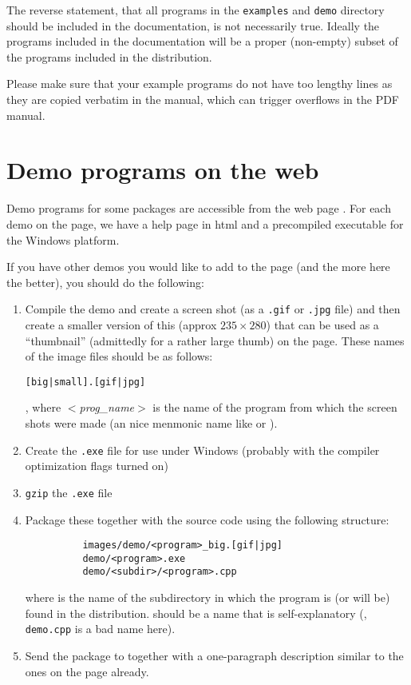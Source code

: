 The reverse statement, that all programs in the \texttt{examples}
and \texttt{demo} directory should be included in the documentation,
is not necessarily true.  Ideally the programs included in the documentation
will be a proper (non-empty) subset of the programs included in the 
distribution.

Please make sure that your example programs do not have too lengthy lines
as they are copied verbatim in the manual, which can trigger overflows
in the PDF manual.

\section{Demo programs on the web\label{sec:demos_web_page}}

Demo programs for some packages are accessible from the 
web page .
For each demo on the page, we have a help page in html and a
precompiled executable for the Windows platform. 

If you have other demos you would like to add to the page (and the more 
here the better), you should do the following:
\begin{enumerate}
\item Compile the demo and create a screen shot (as a \texttt{.gif} or 
      \texttt{.jpg} file) and then create a smaller version of this 
      (approx $235 \times 280$) that can be used as a ``thumbnail'' 
      (admittedly for a rather large thumb) on the page.  These names of
      the image files should be as follows: 
      \centerline{\texttt{[big|small].[gif|jpg]}},
      where \textit{$<$prog\_name$>$} is the name of the program from which
      the screen shots were made (an nice menmonic name like 
       or ).

\item Create the \texttt{.exe} file for use under Windows (probably with the 
      compiler optimization flags turned on)
\item \texttt{gzip} the \texttt{.exe} file
\item Package these together with the source code using the following structure:
      \begin{verbatim}
          images/demo/<program>_big.[gif|jpg]
          demo/<program>.exe
          demo/<subdir>/<program>.cpp
      \end{verbatim}
      where  is the name of the subdirectory in which the program
      is (or will be) found in the distribution.  should be a 
      name that is self-explanatory (\eg, \texttt{demo.cpp} is a bad name here).

\item Send the package to  together with a one-paragraph description similar to the
      ones on the page already.
\end{enumerate}

